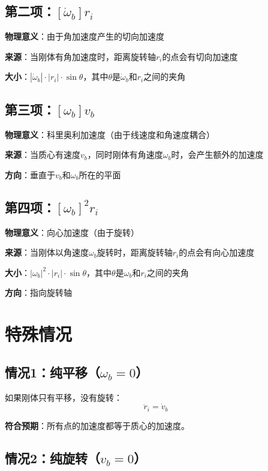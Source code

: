 \documentclass[12pt,a4paper]{article}
\begin{document}
\subsection{第二项：$[\dot{\omega}_b] r_i$}

\textbf{物理意义}：由于角加速度产生的切向加速度

\textbf{来源}：当刚体有角加速度时，距离旋转轴$r_i$的点会有切向加速度

\textbf{大小}：$|\dot{\omega}_b| \cdot |r_i| \cdot \sin\theta$，其中$\theta$是$\dot{\omega}_b$和$r_i$之间的夹角

\subsection{第三项：$[\omega_b] v_b$}

\textbf{物理意义}：科里奥利加速度（由于线速度和角速度耦合）

\textbf{来源}：当质心有速度$v_b$，同时刚体有角速度$\omega_b$时，会产生额外的加速度

\textbf{方向}：垂直于$v_b$和$\omega_b$所在的平面

\subsection{第四项：$[\omega_b]^2 r_i$}

\textbf{物理意义}：向心加速度（由于旋转）

\textbf{来源}：当刚体以角速度$\omega_b$旋转时，距离旋转轴$r_i$的点会有向心加速度

\textbf{大小}：$|\omega_b|^2 \cdot |r_i| \cdot \sin\theta$，其中$\theta$是$\omega_b$和$r_i$之间的夹角

\textbf{方向}：指向旋转轴

\section{特殊情况}

\subsection{情况1：纯平移（$\omega_b = 0$）}

如果刚体只有平移，没有旋转：
\begin{equation}
\ddot{r}_i = \dot{v}_b
\end{equation}

\textbf{符合预期}：所有点的加速度都等于质心的加速度。

\subsection{情况2：纯旋转（$v_b = 0$）}
\end{document}
